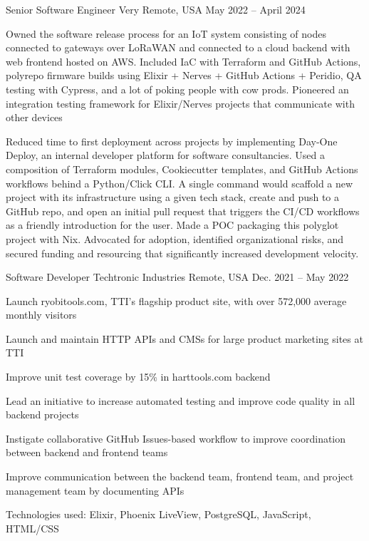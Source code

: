 
\begin{cventries}

  \cventry
  {Senior Software Engineer} %
  {Very} %
  {Remote, USA} %
  {May 2022 -- April 2024} %
  {
    \begin{cvitems}
      \item Owned the software release process for an IoT system consisting of
        nodes connected to gateways over LoRaWAN and connected to a cloud
        backend with web frontend hosted on AWS.
        \subitem Included IaC with Terraform and GitHub Actions, polyrepo
        firmware builds using Elixir + Nerves + GitHub Actions + Peridio,
        QA testing with Cypress, and a lot of poking people with cow prods.
        \subitem Pioneered an integration testing framework for Elixir/Nerves
        projects that communicate with other devices
      \item Reduced time to first deployment across projects by implementing
        Day-One Deploy, an internal developer platform for software
        consultancies.
        \subitem Used a composition of Terraform modules, Cookiecutter
        templates, and GitHub Actions workflows behind a Python/Click CLI.
        \subitem A single command would scaffold a new project with its
        infrastructure using a given tech stack, create and push to a GitHub
        repo, and open an initial pull request that triggers the CI/CD workflows
        as a friendly introduction for the user.
        \subitem Made a POC packaging this polyglot project with Nix.
        \subitem Advocated for adoption, identified organizational risks, and
        secured funding and resourcing that significantly increased development
        velocity.
      \end{cvitems}
    }

    \cventry
    {Software Developer} %
    {Techtronic Industries} %
    {Remote, USA} %
    {Dec. 2021 -- May 2022} %
    {
      \begin{cvitems}
      \item Launch ryobitools.com, TTI’s flagship product site, with over
        572,000 average monthly visitors
      \item Launch and maintain HTTP APIs and CMSs for large product marketing
        sites at TTI
      \item Improve unit test coverage by 15\% in harttools.com backend
      \item Lead an initiative to increase automated testing and improve code
        quality in all backend projects
      \item Instigate collaborative GitHub Issues-based workflow to improve
        coordination between backend and frontend teams
      \item Improve communication between the backend team, frontend team, and
        project management team by documenting APIs
      \item Technologies used: Elixir, Phoenix LiveView, PostgreSQL, JavaScript,
        HTML/CSS
      \end{cvitems}
    }

  \end{cventries}
